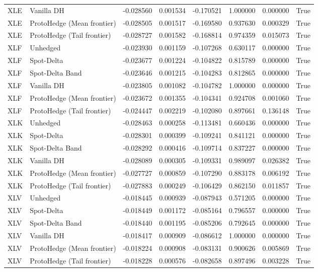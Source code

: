 \begin{tabular}{llrrrrrr}
XLE & Vanilla DH & -0.028560 & 0.001534 & -0.170521 & 1.000000 & 0.000000 & True \\
XLE & ProtoHedge (Mean frontier) & -0.028505 & 0.001517 & -0.169580 & 0.937630 & 0.000329 & True \\
XLE & ProtoHedge (Tail frontier) & -0.028727 & 0.001582 & -0.168814 & 0.974359 & 0.015073 & True \\
XLF & Unhedged & -0.023930 & 0.001159 & -0.107268 & 0.630117 & 0.000000 & True \\
XLF & Spot-Delta & -0.023677 & 0.001224 & -0.104822 & 0.815789 & 0.000000 & True \\
XLF & Spot-Delta Band & -0.023646 & 0.001215 & -0.104283 & 0.812865 & 0.000000 & True \\
XLF & Vanilla DH & -0.023805 & 0.001082 & -0.104782 & 1.000000 & 0.000000 & True \\
XLF & ProtoHedge (Mean frontier) & -0.023672 & 0.001355 & -0.104341 & 0.924708 & 0.001060 & True \\
XLF & ProtoHedge (Tail frontier) & -0.024447 & 0.002219 & -0.102080 & 0.897661 & 0.136148 & True \\
XLK & Unhedged & -0.028463 & 0.000258 & -0.113481 & 0.660436 & 0.000000 & True \\
XLK & Spot-Delta & -0.028301 & 0.000399 & -0.109241 & 0.841121 & 0.000000 & True \\
XLK & Spot-Delta Band & -0.028292 & 0.000416 & -0.109714 & 0.837227 & 0.000000 & True \\
XLK & Vanilla DH & -0.028089 & 0.000305 & -0.109331 & 0.989097 & 0.026382 & True \\
XLK & ProtoHedge (Mean frontier) & -0.027727 & 0.000859 & -0.107290 & 0.883178 & 0.006192 & True \\
XLK & ProtoHedge (Tail frontier) & -0.027883 & 0.000249 & -0.106429 & 0.862150 & 0.011857 & True \\
XLV & Unhedged & -0.018445 & 0.000939 & -0.087943 & 0.571205 & 0.000000 & True \\
XLV & Spot-Delta & -0.018449 & 0.001172 & -0.085164 & 0.796557 & 0.000000 & True \\
XLV & Spot-Delta Band & -0.018440 & 0.001195 & -0.085206 & 0.792645 & 0.000000 & True \\
XLV & Vanilla DH & -0.018417 & 0.000909 & -0.086612 & 1.000000 & 0.000000 & True \\
XLV & ProtoHedge (Mean frontier) & -0.018224 & 0.000908 & -0.083131 & 0.900626 & 0.005869 & True \\
XLV & ProtoHedge (Tail frontier) & -0.018228 & 0.000576 & -0.082658 & 0.897496 & 0.003228 & True \\
\bottomrule
\end{tabular}
